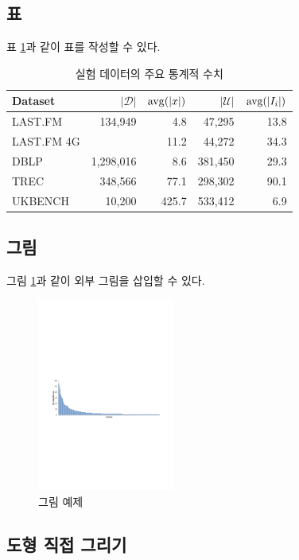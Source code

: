\subsection{표}
표 \ref{tab:datasets}과 같이 표를 작성할 수 있다.
\begin{table}[!ht]
\centering
\setlength{\belowcaptionskip}{5pt}
\caption{실험 데이터의 주요 통계적 수치}
\label{tab:datasets}
\begin{tabular}{@{}lrrrr@{}} 
\toprule
{\bfseries Dataset} & $|\mathcal{D}|$ & ${\rm avg}(|x|)$ & $|\mathcal{U}|$ & ${\rm avg}(|I_i|)$ \\
\midrule
LAST.FM			&134,949	&  4.8	& 47,295	& 13.8\\
LAST.FM 4G		&			& 11.2	& 44,272	& 34.3\\
DBLP			&1,298,016	&  8.6	&381,450	& 29.3\\
TREC			&348,566	& 77.1	&298,302	& 90.1\\
UKBENCH			&10,200		&425.7	&533,412	&  6.9\\
\bottomrule
\end{tabular}
\end{table}


\subsection{그림}

그림 \ref{fig:example1}과 같이 외부 그림을 삽입할 수 있다.

\begin{figure}[!ht]
\centering
\includegraphics[width=0.4\textwidth]{figures/features.pdf}
\caption{그림 예제}
\label{fig:example1}
\end{figure}


\subsection{도형 직접 그리기}

